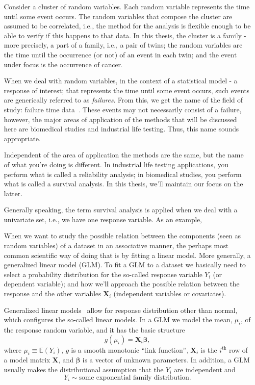 Consider a cluster of random variables. Each random variable represents
the time until some event occurs. The random variables that compose the
cluster are assumed to be correlated, i.e., the method for the analysis
is flexible enough to be able to verify if this happens to that data. In
this thesis, the cluster is a family - more precisely, a part of a
family, i.e., a pair of twins; the random variables are the time until
the occurrence (or not) of an event in each twin; and the event under
focus is the occurrence of cancer.

When we deal with random variables, in the context of a statistical
model - a response of interest; that represents the time until some
event occurs, such events are generically referred to as
\textit{failures}. From this, we get the name of the field of study:
failure time data~\cite{kalb&prentice}. These events may not necessarily
consist of a failure, however, the major areas of application of the
methods that will be discussed here are biomedical studies and
industrial life testing. Thus, this name sounds appropriate.

Independent of the area of application the methods are the same, but the
name of what you're doing is different. In industrial life testing
applications, you perform what is called a reliability analysis; in
biomedical studies, you perform what is called a survival analysis. In
this thesis, we'll maintain our focus on the latter.

Generally speaking, the term survival analysis is applied when we deal
with a univariate set, i.e., we have one response variable. As an
example,

When we want to study the possible relation between the components (seen
as random variables) of a dataset in an associative manner, the perhaps
most common scientific way of doing that is by fitting a linear model.
More generally, a generalized linear model (GLM). To fit a GLM to a
dataset we basically need to select a probability distribution for the
so-called response variable \(Y_{i}\) (or dependent variable); and how
we'll approach the possible relation between the response and the other
variables \(\mathbf{X}_{i}\) (independent variables or covariates).

Generalized linear models~\cite{GLM72} allow for response distribution
other than normal, which configures the so-called linear models. In a
GLM we model the mean, \(\mu_{i}\), of the response random variable, and
it has the basic structure
\[
 g(\mu_{i}) = \mathbf{X}_{i} \bm{\beta},
\]
where \(\mu_{i} \equiv \mathbb{E}(Y_{i})\), \(g\) is a smooth monotonic
``link function'', \(\mathbf{X}_{i}\) is the \(i^\text{th}\) row of a
model matrix \(\mathbf{X}\), and \(\bm{\beta}\) is a vector of unknown
parameters. In addition, a GLM usually makes the distributional
assumption that the \(Y_{i}\) are independent and
\[
  Y_{i} \sim \text{some exponential family distribution}.
\]

